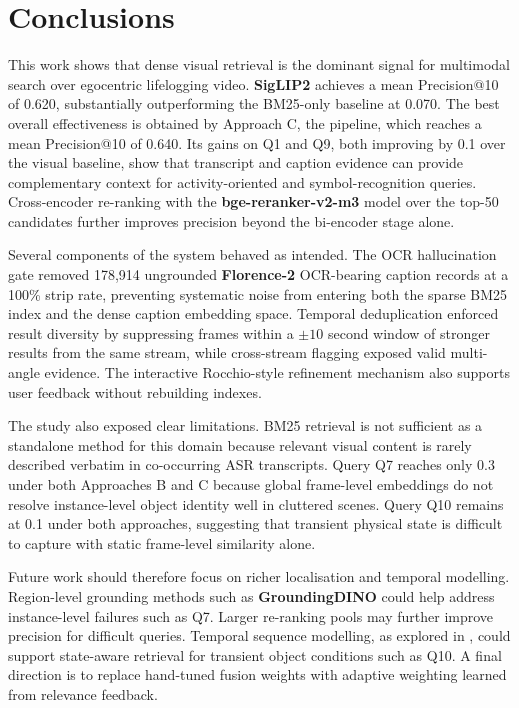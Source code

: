 \section{Conclusions}
\label{sec:conclusions}

This work shows that dense visual retrieval is the dominant signal for multimodal search over egocentric lifelogging video. \textbf{SigLIP2} achieves a mean Precision@10 of 0.620, substantially outperforming the BM25-only baseline at 0.070. The best overall effectiveness is obtained by Approach C, the \fusionname pipeline, which reaches a mean Precision@10 of 0.640. Its gains on Q1 and Q9, both improving by 0.1 over the visual baseline, show that transcript and caption evidence can provide complementary context for activity-oriented and symbol-recognition queries. Cross-encoder re-ranking with the \textbf{bge-reranker-v2-m3} model over the top-50 candidates further improves precision beyond the bi-encoder stage alone.

Several components of the system behaved as intended. The OCR hallucination gate removed 178,914 ungrounded \textbf{Florence-2} OCR-bearing caption records at a 100\% strip rate, preventing systematic noise from entering both the sparse BM25 index and the dense caption embedding space. Temporal deduplication enforced result diversity by suppressing frames within a $\pm 10$ second window of stronger results from the same stream, while cross-stream flagging exposed valid multi-angle evidence. The interactive Rocchio-style refinement mechanism also supports user feedback without rebuilding indexes.

The study also exposed clear limitations. BM25 retrieval is not sufficient as a standalone method for this domain because relevant visual content is rarely described verbatim in co-occurring ASR transcripts. Query Q7 reaches only 0.3 under both Approaches B and C because global frame-level embeddings do not resolve instance-level object identity well in cluttered scenes. Query Q10 remains at 0.1 under both approaches, suggesting that transient physical state is difficult to capture with static frame-level similarity alone.

Future work should therefore focus on richer localisation and temporal modelling. Region-level grounding methods such as \textbf{GroundingDINO} \cite{liu2024groundingdino} could help address instance-level failures such as Q7. Larger re-ranking pools may further improve precision for difficult queries. Temporal sequence modelling, as explored in \cite{lei2021less}, could support state-aware retrieval for transient object conditions such as Q10. A final direction is to replace hand-tuned fusion weights with adaptive weighting learned from relevance feedback.
